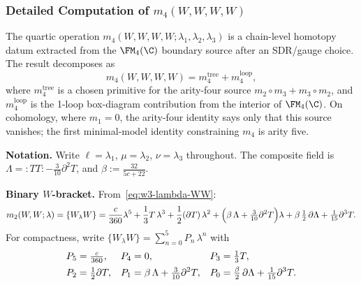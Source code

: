 \subsubsection{Detailed Computation of $m_4(W,W,W,W)$}
\label{subsubsec:w3-m4-WWWW}

The quartic operation \(m_4(W,W,W,W;\lambda_1,\lambda_2,\lambda_3)\)
is a chain-level homotopy datum extracted from the \(\FM_4(\C)\)
boundary source after an SDR/gauge choice.
The result decomposes as
\[
m_4(W,W,W,W) = m_4^{\mathrm{tree}} + m_4^{\mathrm{loop}},
\]
where \(m_4^{\mathrm{tree}}\) is a chosen primitive for the arity-four
source \(m_2\circ m_3+m_3\circ m_2\), and
\(m_4^{\mathrm{loop}}\) is the 1-loop box-diagram contribution from
the interior of \(\FM_4(\C)\). On cohomology, where \(m_1=0\), the
arity-four identity says only that this source vanishes; the first
minimal-model identity constraining \(m_4\) is arity five.

\medskip
\noindent\textbf{Notation.} Write $\ell = \lambda_1$,
$\mu = \lambda_2$, $\nu = \lambda_3$ throughout. The
composite field is
$\Lambda = {:}TT{:} - \tfrac{3}{10}\partial^2 T$, and
$\beta := \tfrac{32}{5c+22}$.

\medskip
\noindent\textbf{Binary \(W\)-bracket.}
From~\eqref{eq:w3-lambda-WW}:
\begin{equation}
\label{eq:m2WW-recap}
m_2(W,W;\lambda) = \{W_\lambda W\}
= \frac{c}{360}\lambda^5
 + \frac{1}{3}T\,\lambda^3
 + \frac{1}{2}(\partial T)\,\lambda^2
 + \Bigl(\beta\,\Lambda + \tfrac{3}{10}\partial^2 T\Bigr)\lambda
 + \beta\,\tfrac{1}{2}\,\partial\Lambda + \tfrac{1}{15}\partial^3 T.
\end{equation}
For compactness, write $\{W_\lambda W\} = \sum_{n=0}^{5} P_n\,\lambda^n$
with
\begin{align}
\label{eq:Pn-coefficients}
P_5 &= \tfrac{c}{360}, &
P_4 &= 0, &
P_3 &= \tfrac{1}{3}T, \notag\\
P_2 &= \tfrac{1}{2}\partial T, &
P_1 &= \beta\,\Lambda + \tfrac{3}{10}\partial^2 T, &
P_0 &= \tfrac{\beta}{2}\,\partial\Lambda + \tfrac{1}{15}\partial^3 T.
\end{align}

